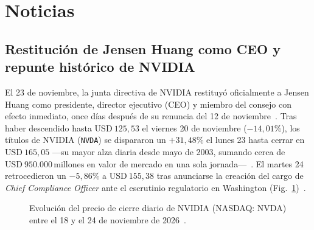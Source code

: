 \documentclass[conference,twocolumn,spanish]{IEEEtran}
\begin{document}
\section{Noticias}

\subsection{Restitución de Jensen Huang como CEO y repunte histórico de NVIDIA}
El 23 de noviembre, la junta directiva de NVIDIA restituyó oficialmente a Jensen Huang como presidente, director ejecutivo (CEO) y miembro del consejo con efecto inmediato, once días después de su renuncia del 12 de noviembre~\cite{nvidia_huang_reinstated_2026,guardian_nvidia_huang_2026}. Tras haber descendido hasta $\text{USD}~125{,}53$ el viernes 20 de noviembre ($-14{,}01\%$), los títulos de NVIDIA (\texttt{NVDA}) se dispararon un $+31{,}48\%$ el lunes 23 hasta cerrar en $\text{USD}~165{,}05$ ---su mayor alza diaria desde mayo de 2003, sumando cerca de $\text{USD}~950.000\,\text{millones}$ en valor de mercado en una sola jornada---~\cite{cna_nvidia_comeback_2026,investing_nvda_2026}. El martes 24 retrocedieron un $-5{,}86\%$ a $\text{USD}~155{,}38$ tras anunciarse la creación del cargo de \textit{Chief Compliance Officer} ante el escrutinio regulatorio en Washington (Fig.~\ref{fig:nvda_sem3})~\cite{cna_nvidia_comeback_2026,investing_nvda_2026}.

\begin{figure}[htbp]
\centering
{}
\caption{Evolución del precio de cierre diario de NVIDIA (NASDAQ: NVDA) entre el 18 y el 24 de noviembre de 2026~\cite{investing_nvda_2026}.}
\label{fig:nvda_sem3}
\end{figure}
\end{document}
